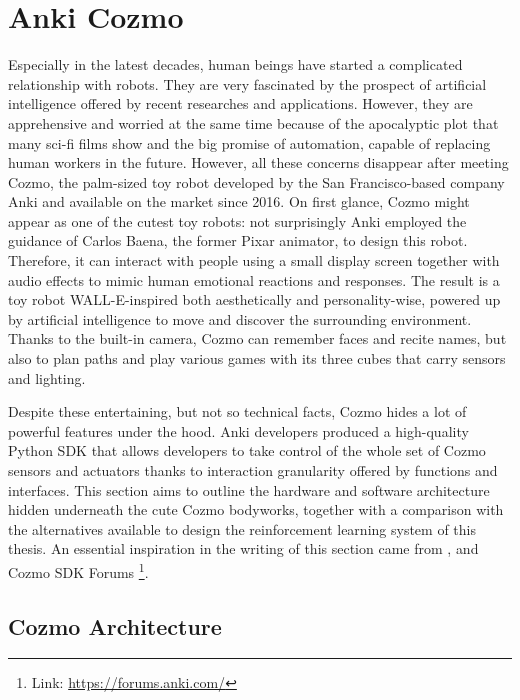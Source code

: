 \section{Anki Cozmo}

Especially in the latest decades, human beings have started a complicated relationship with robots. They are very fascinated by the prospect of artificial intelligence offered by recent researches and applications. However, they are apprehensive and worried at the same time because of the apocalyptic plot that many sci-fi films show and the big promise of automation, capable of replacing human workers in the future.
However, all these concerns disappear after meeting Cozmo, the palm-sized toy robot developed by the San Francisco-based company Anki and available on the market since 2016.
On first glance, Cozmo might appear as one of the cutest toy robots: not surprisingly Anki employed the guidance of Carlos Baena, the former Pixar animator, to design this robot.
Therefore, it can interact with people using a small display screen together with audio effects to mimic human emotional reactions and responses.
The result is a toy robot WALL-E-inspired both aesthetically and personality-wise, powered up by artificial intelligence to move and discover the surrounding environment. Thanks to the built-in camera, Cozmo can remember faces and recite names, but also to plan paths and play various games with its three cubes that carry sensors and lighting.

Despite these entertaining, but not so technical facts, Cozmo hides a lot of powerful features under the hood. Anki developers produced a high-quality Python SDK that allows developers to take control of the whole set of Cozmo sensors and actuators thanks to interaction granularity offered by functions and interfaces.
This section aims to outline the hardware and software architecture hidden underneath the cute Cozmo bodyworks, together with a comparison with the alternatives available to design the reinforcement learning system of this thesis. An essential inspiration in the writing of this section came from \cite{mellon2017cognitive}, \cite{touretzky2018cozmopedia} and Cozmo SDK Forums \footnote{Link: \href{https://forums.anki.com/}{https://forums.anki.com/}}.

\subsection{Cozmo Architecture}

